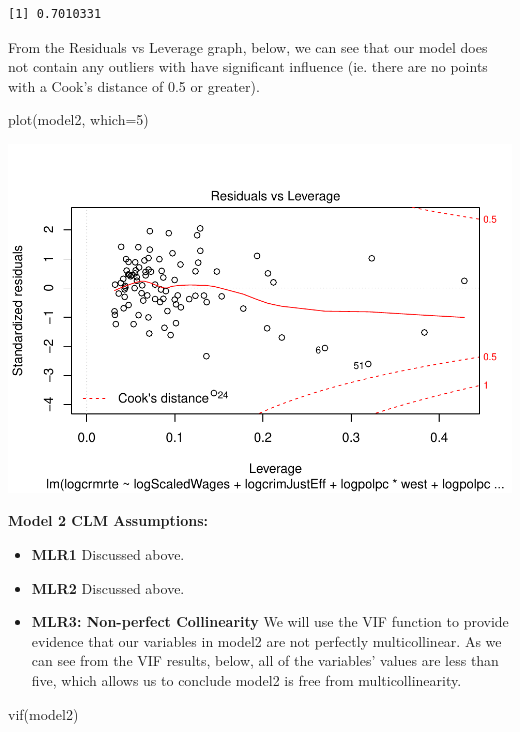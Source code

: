 \documentclass[]{article}
\newenvironment{Shaded}{}{}
\newcommand{\DataTypeTok}[1]{#1}
\newcommand{\DecValTok}[1]{#1}
\newcommand{\KeywordTok}[1]{\textcolor[rgb]{0.00,0.00,1.00}{#1}}
\newcommand{\NormalTok}[1]{#1}
\begin{document}
\begin{verbatim}
[1] 0.7010331
\end{verbatim}

From the Residuals vs Leverage graph, below, we can see that our model
does not contain any outliers with have significant influence (ie. there
are no points with a Cook's distance of 0.5 or greater).

\begin{Shaded}
\begin{Highlighting}[]
\KeywordTok{plot}\NormalTok{(model2, }\DataTypeTok{which=}\DecValTok{5}\NormalTok{)}
\end{Highlighting}
\end{Shaded}

\includegraphics{Bagnard_Gaustad_Hartman_Leung_Lab_3_files/figure-latex/unnamed-chunk-70-1.pdf}

\textbf{Model 2 CLM Assumptions:}

\begin{itemize}
\item
  \textbf{MLR1} Discussed above.
\item
  \textbf{MLR2} Discussed above.
\item
  \textbf{MLR3: Non-perfect Collinearity} We will use the VIF function
  to provide evidence that our variables in model2 are not perfectly
  multicollinear. As we can see from the VIF results, below, all of the
  variables' values are less than five, which allows us to conclude
  model2 is free from multicollinearity.
\end{itemize}

\begin{Shaded}
\begin{Highlighting}[]
\KeywordTok{vif}\NormalTok{(model2)}
\end{Highlighting}
\end{Shaded}
\end{document}
